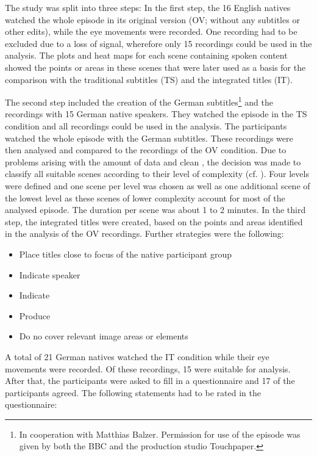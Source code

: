 The study was split into three steps: In the first step, the 16 English natives watched the whole episode in its original version (OV; without any subtitles or other edits), while the eye movements were recorded. One recording had to be excluded due to a loss of signal, wherefore only 15 recordings could be used in the analysis. The  plots and heat maps for each scene containing spoken content showed the  points or areas in these scenes that were later used as a basis for the comparison with the traditional subtitles (TS) and the integrated titles (IT).

The second step included the creation of the German subtitles\footnote{In cooperation with Matthias Balzer. Permission for use of the episode was given by both the BBC and the production studio Touchpaper.} and the  recordings with 15 German native speakers. They watched the episode in the TS condition and all recordings could be used in the analysis. The participants watched the whole episode with the German subtitles. These recordings were then analysed and compared to the recordings of the OV condition. Due to problems arising with the amount of data and clean , the decision was made to classify all suitable scenes according to their level of complexity (cf. \citealt{Fox2012}). Four levels were defined and one scene per level was chosen as well as one additional scene of the lowest level as these scenes of lower complexity account for most of the analysed episode. The duration per scene was about 1 to 2 minutes. In the third step, the integrated titles were created, based on the  points and areas identified in the analysis of the OV recordings. Further  strategies were the following:

\begin{itemize}
\item Place titles close to focus of the native participant group
\item Indicate speaker
\item Indicate 
\item Produce 
\item Do no cover relevant image areas or elements
\end{itemize}

A total of 21 German natives watched the IT condition while their eye movements were recorded. Of these recordings, 15 were suitable for analysis. After that, the participants were asked to fill in a questionnaire and 17 of the participants agreed. The following statements had to be rated in the questionnaire:

